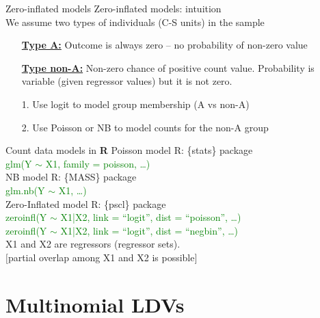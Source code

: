 \documentclass[usenames,dvipsnames]{beamer}
\begin{document}
\begin{frame}{Zero-inflated models}
Zero-inflated models: intuition\\
\bigskip
We assume two types of individuals (C-S units) in the sample\\
\begin{itemize}
\item[] \underline{\textbf{Type A:}} Outcome is always zero – no probability of non-zero value\\
\medskip
\item[] \underline{\textbf{Type non-A:}} Non-zero chance of positive count value. Probability is variable (given regressor values) but it is not zero.
\end{itemize}
\medskip
\begin{itemize}
\item[1.] Use logit to model group membership (A vs non-A)
\item[2.] Use Poisson or NB to model counts for the  non-A group
\end{itemize}
\end{frame}
\begin{frame}{Count data models in  \textbf{R}}
Poisson model \qquad \qquad R: \{stats\} package\\
\medskip
\textcolor{Green}{glm(Y $\sim$ X1, family = poisson, \dots )}\\
\vspace*{.4cm}
NB model \qquad \qquad \qquad R: \{MASS\} package\\
\medskip
\textcolor{Green}{glm.nb(Y $\sim$ X1, \dots)} \\
\vspace*{.4cm}
Zero-Inflated model \qquad R: \{pscl\} package\\
\textcolor{Green}{zeroinfl(Y $\sim$ X1|X2, link = ``logit'', dist = ``poisson'', \dots)} \\
\medskip
\textcolor{Green}{zeroinfl(Y $\sim$ X1|X2, link = ``logit'', dist = ``negbin'', \dots)} \\
\vspace*{.2cm}
X1 and X2 are regressors (regressor sets). \\
$[$partial overlap among X1 and X2 is possible$]$
\end{frame}
\section{Multinomial LDVs}
\end{document}

